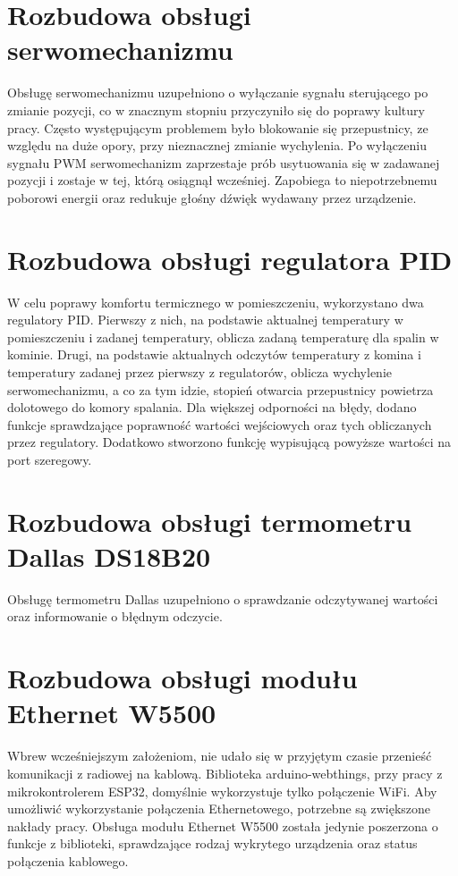 \documentclass[11pt]{report}
\begin{document}
 \section{Rozbudowa obsługi serwomechanizmu}
 Obsługę serwomechanizmu uzupełniono o wyłączanie sygnału sterującego po zmianie pozycji, co w znacznym stopniu przyczyniło się do poprawy kultury pracy. Często występującym problemem było blokowanie się przepustnicy, ze względu na duże opory, przy nieznacznej zmianie wychylenia. Po wyłączeniu sygnału PWM serwomechanizm zaprzestaje prób usytuowania się w zadawanej pozycji i zostaje w tej, którą osiągnął wcześniej. Zapobiega to niepotrzebnemu poborowi energii oraz redukuje głośny dźwięk wydawany przez urządzenie.

 \section{Rozbudowa obsługi regulatora PID}
 W celu poprawy komfortu termicznego w pomieszczeniu, wykorzystano dwa regulatory PID. Pierwszy z nich, na podstawie aktualnej temperatury w pomieszczeniu i zadanej temperatury, oblicza zadaną temperaturę dla spalin w kominie. Drugi, na podstawie aktualnych odczytów temperatury z komina i temperatury zadanej przez pierwszy z regulatorów, oblicza wychylenie serwomechanizmu, a co za tym idzie, stopień otwarcia przepustnicy powietrza dolotowego do komory spalania.
 Dla większej odporności na błędy, dodano funkcje sprawdzające poprawność wartości wejściowych oraz tych obliczanych przez regulatory. Dodatkowo stworzono funkcję wypisującą powyższe wartości na port szeregowy.

 \section{Rozbudowa obsługi termometru Dallas DS18B20}
 Obsługę termometru Dallas uzupełniono o sprawdzanie odczytywanej wartości oraz informowanie o błędnym odczycie.

 \section{Rozbudowa obsługi modułu Ethernet W5500}
 Wbrew wcześniejszym założeniom, nie udało się w przyjętym czasie przenieść komunikacji z radiowej na kablową.
Biblioteka arduino-webthings, przy pracy z mikrokontrolerem ESP32, domyślnie wykorzystuje tylko połączenie WiFi. Aby umożliwić wykorzystanie połączenia Ethernetowego, potrzebne są zwiększone nakłady pracy.
  Obsługa modułu Ethernet W5500 została jedynie poszerzona o funkcje z biblioteki, sprawdzające rodzaj wykrytego urządzenia oraz status połączenia kablowego.
 
\end{document}
